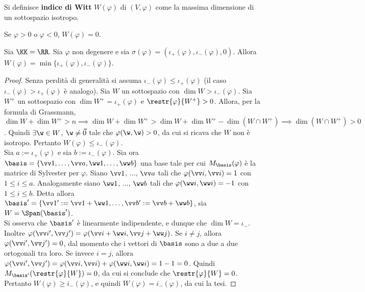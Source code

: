 \documentclass[11pt]{article}
\begin{document}
	\begin{definition}
		Si definisce \textbf{indice di Witt} $W(\varphi)$ di $(V, \varphi)$
		come la massima dimensione di un sottospazio isotropo. 
	\end{definition}

	\begin{remark}\nl
		\li Se $\varphi > 0$ o $\varphi < 0$, $W(\varphi) = 0$.
	\end{remark}

	\begin{proposition}
		Sia $\KK = \RR$. Sia $\varphi$ non degenere e sia $\sigma(\varphi) = (\iota_+(\varphi), \iota_-(\varphi), 0)$. Allora
		$W(\varphi) = \min\{\iota_+(\varphi), \iota_-(\varphi)\}$.
	\end{proposition}

	\begin{proof}
		Senza perdità di generalità si assuma $\iota_-(\varphi) \leq \iota_+(\varphi)$ (il caso $\iota_-(\varphi) > \iota_+(\varphi)$ è analogo). Sia $W$ un sottospazio con $\dim W > \iota_-(\varphi)$. Sia $W^+$
		un sottospazio con $\dim W^+ = \iota_+(\varphi)$ e $\restr{\varphi}{W^+} > 0$. Allora, per la formula
		di Grassmann, $\dim W + \dim W^+ > n \implies \dim W + \dim W^+ > \dim W + \dim W^+ - \dim (W \cap W^+) \implies \dim (W \cap W^+) > 0$. Quindi $\exists \w \in W$, $\w \neq \vec 0$ tale che $\varphi(\w, \w) > 0$, da cui
		si ricava che $W$ non è isotropo. Pertanto $W(\varphi) \leq \iota_-(\varphi)$. \\
		
		Sia $a := \iota_+(\varphi)$ e sia $b := \iota_-(\varphi)$.
		Sia ora $\basis = \{ \vv 1, \ldots, \vv a, \ww 1, \ldots, \ww b \}$ una base tale per cui $M_\basis(\varphi)$ è  la matrice di Sylvester per $\varphi$. Siano $\vv 1$, ..., $\vv a$ tali che $\varphi(\vv i, \vv i) = 1$
		con $1 \leq i \leq a$. Analogamente siano $\ww 1$, ..., $\ww b$ tali che $\varphi(\ww i, \ww i) = -1$ con
		$1 \leq i \leq b$. Detta allora $\basis' = \{ \vv 1 ' := \vv 1 + \ww 1, \ldots, \vv b ' := \vv b + \ww b \}$, sia $W = \Span(\basis')$. \\
		
		Si osserva che $\basis'$ è linearmente indipendente, e dunque che $\dim W = \iota_-$. Inoltre
		$\varphi(\vv i ', \vv j ') = \varphi(\vv i + \ww i, \vv j + \ww j)$. Se $i \neq j$, allora
		$\varphi(\vv i ', \vv j ') = 0$, dal momento che i vettori di $\basis$ sono a due a due ortogonali
		tra loro. Se invece $i = j$, allora $\varphi(\vv i ', \vv j ') = \varphi(\vv i, \vv i) + \varphi(\ww i, \ww i) = 1-1=0$. Quindi $M_{\basis'}(\restr{\varphi}{W}) = 0$, da cui si conclude che $\restr{\varphi}{W} = 0$.
		Pertanto $W(\varphi) \geq i_-(\varphi)$, e quindi $W(\varphi) = i_-(\varphi)$, da cui la tesi.
	\end{proof}
\end{document}
